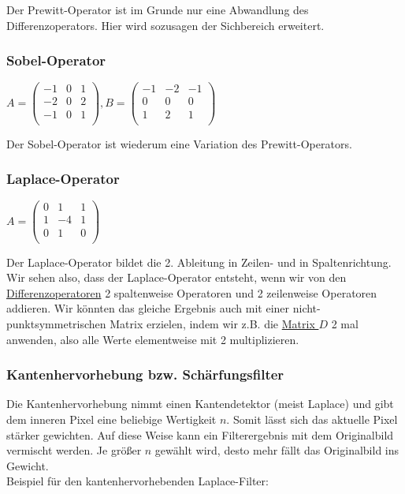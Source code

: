 \vspace{5px}

Der Prewitt-Operator ist im Grunde nur eine Abwandlung des Differenzoperators. Hier wird sozusagen der Sichbereich erweitert.

\subsubsection{Sobel-Operator}
\label{sec:sobel-operator}

$
    A
    =
    \begin{pmatrix}
        -1 & 0 & 1 \\
        -2 & 0 & 2 \\
        -1 & 0 & 1 \\
    \end{pmatrix}
    ,
    B
    =
    \begin{pmatrix}
        -1 & -2 & -1 \\
        0  & 0  & 0  \\
        1  & 2  & 1  \\
    \end{pmatrix}
$

Der Sobel-Operator ist wiederum eine Variation des Prewitt-Operators.

\subsubsection{Laplace-Operator}

$
    A
    =
    \begin{pmatrix}
        0 & 1  & 1 \\
        1 & -4 & 1 \\
        0 & 1  & 0 \\
    \end{pmatrix}
$

\vspace{5px}

Der Laplace-Operator bildet die 2. Ableitung in Zeilen- und in Spaltenrichtung. Wir sehen also, dass der Laplace-Operator entsteht, wenn wir von den \hyperref[sec:difference-operator]{Differenzoperatoren} 2 spaltenweise Operatoren und 2 zeilenweise Operatoren addieren. Wir könnten das gleiche Ergebnis auch mit einer nicht-punktsymmetrischen Matrix erzielen, indem wir z.B. die \hyperref[sec:difference-operator]{Matrix $D$} 2 mal anwenden, also alle Werte elementweise mit 2 multiplizieren.

\subsubsection{Kantenhervorhebung bzw. Schärfungsfilter}
Die Kantenhervorhebung nimmt einen Kantendetektor (meist Laplace) und gibt dem inneren Pixel eine beliebige Wertigkeit $n$. Somit lässt sich das aktuelle Pixel stärker gewichten. Auf diese Weise kann ein Filterergebnis mit dem Originalbild vermischt werden. Je größer $n$ gewählt wird, desto mehr fällt das Originalbild ins Gewicht.\\
Beispiel für den kantenhervorhebenden Laplace-Filter:


